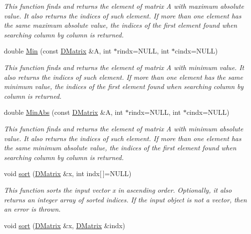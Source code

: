 \begin{DoxyCompactItemize}
\begin{DoxyCompactList}\small\item\em This function finds and returns the element of matrix A with maximum absolute value. It also returns the indices of such element. If more than one element has the same maximum absolute value, the indices of the first element found when searching column by column is returned. \item\end{DoxyCompactList}\item 
double \hyperlink{classDMatrix_a6168ace6eec6c2c1724638a1e4c1059c}{Min} (const \hyperlink{classDMatrix}{DMatrix} \&A, int $\ast$rindx=NULL, int $\ast$cindx=NULL)
\begin{DoxyCompactList}\small\item\em This function finds and returns the element of matrix A with minimum value. It also returns the indices of such element. If more than one element has the same minimum value, the indices of the first element found when searching column by column is returned. \item\end{DoxyCompactList}\item 
double \hyperlink{classDMatrix_a8a3779432dbf1db00faf44079f9a4129}{MinAbs} (const \hyperlink{classDMatrix}{DMatrix} \&A, int $\ast$rindx=NULL, int $\ast$cindx=NULL)
\begin{DoxyCompactList}\small\item\em This function finds and returns the element of matrix A with minimum absolute value. It also returns the indices of such element. If more than one element has the same minimum absolute value, the indices of the first element found when searching column by column is returned. \item\end{DoxyCompactList}\item 
void \hyperlink{classDMatrix_ad77fbdfed1b98748e430e4efc2c91856}{sort} (\hyperlink{classDMatrix}{DMatrix} \&x, int indx\mbox{[}$\,$\mbox{]}=NULL)
\begin{DoxyCompactList}\small\item\em This function sorts the input vector x in ascending order. Optionally, it also returns an integer array of sorted indices. If the input object is not a vector, then an error is thrown. \item\end{DoxyCompactList}\item 
void \hyperlink{classDMatrix_a6b5be996dbe79c22b1a6d616644a1b73}{sort} (\hyperlink{classDMatrix}{DMatrix} \&x, \hyperlink{classDMatrix}{DMatrix} \&indx)

\end{DoxyCompactItemize}
